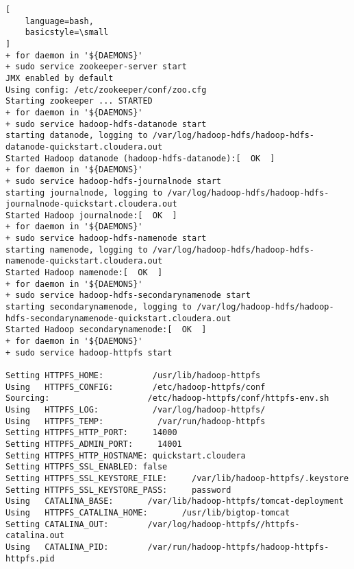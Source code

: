 \documentclass[a4paper]{article}
\begin{document}
\begin{lstlisting}[
    language=bash,
    basicstyle=\small
]
+ for daemon in '${DAEMONS}'
+ sudo service zookeeper-server start
JMX enabled by default
Using config: /etc/zookeeper/conf/zoo.cfg
Starting zookeeper ... STARTED
+ for daemon in '${DAEMONS}'
+ sudo service hadoop-hdfs-datanode start
starting datanode, logging to /var/log/hadoop-hdfs/hadoop-hdfs-datanode-quickstart.cloudera.out
Started Hadoop datanode (hadoop-hdfs-datanode):[  OK  ]
+ for daemon in '${DAEMONS}'
+ sudo service hadoop-hdfs-journalnode start
starting journalnode, logging to /var/log/hadoop-hdfs/hadoop-hdfs-journalnode-quickstart.cloudera.out
Started Hadoop journalnode:[  OK  ]
+ for daemon in '${DAEMONS}'
+ sudo service hadoop-hdfs-namenode start
starting namenode, logging to /var/log/hadoop-hdfs/hadoop-hdfs-namenode-quickstart.cloudera.out
Started Hadoop namenode:[  OK  ]
+ for daemon in '${DAEMONS}'
+ sudo service hadoop-hdfs-secondarynamenode start
starting secondarynamenode, logging to /var/log/hadoop-hdfs/hadoop-hdfs-secondarynamenode-quickstart.cloudera.out
Started Hadoop secondarynamenode:[  OK  ]
+ for daemon in '${DAEMONS}'
+ sudo service hadoop-httpfs start

Setting HTTPFS_HOME:          /usr/lib/hadoop-httpfs
Using   HTTPFS_CONFIG:        /etc/hadoop-httpfs/conf
Sourcing:                    /etc/hadoop-httpfs/conf/httpfs-env.sh
Using   HTTPFS_LOG:           /var/log/hadoop-httpfs/
Using   HTTPFS_TEMP:           /var/run/hadoop-httpfs
Setting HTTPFS_HTTP_PORT:     14000
Setting HTTPFS_ADMIN_PORT:     14001
Setting HTTPFS_HTTP_HOSTNAME: quickstart.cloudera
Setting HTTPFS_SSL_ENABLED: false
Setting HTTPFS_SSL_KEYSTORE_FILE:     /var/lib/hadoop-httpfs/.keystore
Setting HTTPFS_SSL_KEYSTORE_PASS:     password
Using   CATALINA_BASE:       /var/lib/hadoop-httpfs/tomcat-deployment
Using   HTTPFS_CATALINA_HOME:       /usr/lib/bigtop-tomcat
Setting CATALINA_OUT:        /var/log/hadoop-httpfs//httpfs-catalina.out
Using   CATALINA_PID:        /var/run/hadoop-httpfs/hadoop-httpfs-httpfs.pid


\end{lstlisting}
\end{document}
